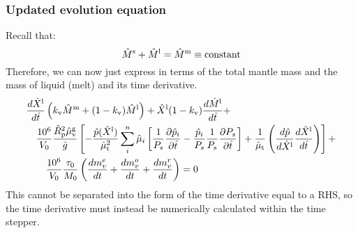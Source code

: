 \subsubsection{Updated evolution equation}
Recall that:
\begin{equation}
\hat{M}^{\rm s} + \hat{M}^{\rm l} = \hat{M}^{\rm m} \equiv \text{constant}
\label{eq:mantle_mass}
\end{equation}
Therefore, we can now just express in terms of the total mantle mass and the mass of liquid (melt) and its time derivative.   
\begin{align}
&\frac{d \hat{X}^{\rm l}}{d\hat{t}} \left(k_{\rm v} \hat{M}^{\rm m} + (1-k_{\rm v}) \hat{M}^{\rm l} \right)
+ \hat{X}^{\rm l} (1-k_{\rm v}) \frac{d \hat{M}^{\rm l}}{d\hat{t}} + \nonumber \\
&\quad \frac{10^6}{V_0} \frac{\hat{R}_{\rm p}^2 \hat{\mu}_{\rm v}^{\rm g}}{\hat{g}}
\left[
-\frac{\hat{p}(\hat{X}^{\rm l})}{\hat{\mu}_{\rm t}^2} \sum_i^n \hat{\mu}_i \left[ \frac{1}{P_s} \frac{\partial \hat{p}_i}{\partial \hat{t}} - \frac{\hat{p}_i}{P_s} \frac{1}{P_s} \frac{\partial P_s}{\partial \hat{t}} \right] + \frac{1}{\hat{\mu}_{\rm t}} \left( \frac{d \hat{p}}{d \hat{X}^{\rm l}} \frac{d \hat{X}^{\rm l}}{d \hat{t}} \right)
\right]+ \nonumber \\
& \qquad \frac{10^6}{V_0} \frac{\tau_0}{M_0} \left( \frac{dm_v^e}{dt} +  \frac{dm_v^o}{dt} + \frac{dm_v^r}{dt} \right) = 0
\end{align}
This cannot be separated into the form of the time derivative equal to a RHS, so the time derivative must instead be numerically calculated within the time stepper.
